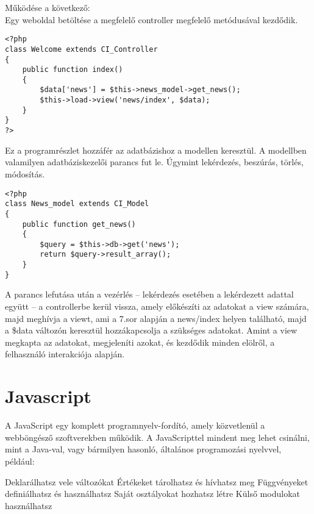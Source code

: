 \documentclass[
]{thesis-ekf}
\begin{document}
Működése a következő:\\
Egy weboldal betöltése a megfelelő controller megfelelő metódusával kezdődik. 
\begin{lstlisting}
<?php
class Welcome extends CI_Controller
{
	public function index()
	{
		$data['news'] = $this->news_model->get_news();
		$this->load->view('news/index', $data);
	}
}
?>
\end{lstlisting}
\newpage
Ez a programrészlet hozzáfér az adatbázishoz a modellen keresztül. A modellben valamilyen adatbáziskezelői parancs fut le. Úgymint lekérdezés, beszúrás, törlés, módosítás. 
\begin{lstlisting}
<?php
class News_model extends CI_Model
{
	public function get_news()
	{
		$query = $this->db->get('news');
		return $query->result_array();
	}
}
\end{lstlisting}
A parancs lefutása után a vezérlés -- lekérdezés esetében a lekérdezett adattal együtt -- a controllerbe kerül vissza, amely előkészíti az adatokat a view számára, majd meghívja a viewt, ami a 7.sor alapján a news/index helyen található, majd a \$data változón keresztül hozzákapcsolja a szükséges adatokat. Amint a view megkapta az adatokat, megjeleníti azokat, és kezdődik minden elölről, a felhasználó interakciója alapján.
\section{Javascript}
A JavaScript egy komplett programnyelv-fordító, amely közvetlenül a webböngésző szoftverekben működik. A JavaScripttel mindent meg lehet csinálni, mint a Java-val, vagy bármilyen hasonló, általános programozási nyelvvel, például:

Deklarálhatsz vele változókat
Értékeket tárolhatsz és hívhatsz meg
Függvényeket definiálhatsz és használhatsz
Saját osztályokat hozhatsz létre
Külső modulokat használhatsz
\end{document}
